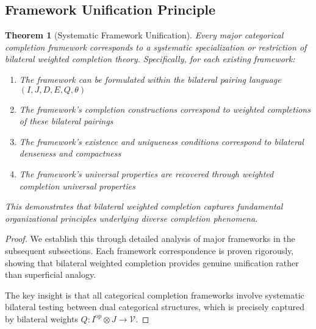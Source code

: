 \documentclass[11pt]{article}
\theoremstyle{plain}
\newtheorem{theorem}{Theorem}[section]
\theoremstyle{definition}
\theoremstyle{remark}
\newcommand{\V}{\mathcal{V}}
\newcommand{\op}{\mathrm{op}}
\begin{document}
\subsection{Framework Unification Principle}

\begin{theorem}[Systematic Framework Unification]\label{thm:framework-unification}
Every major categorical completion framework corresponds to a systematic specialization or restriction of bilateral weighted completion theory. Specifically, for each existing framework:

\begin{enumerate}
\item The framework can be formulated within the bilateral pairing language $(I, J, D, E, Q, \theta)$
\item The framework's completion constructions correspond to weighted completions of these bilateral pairings
\item The framework's existence and uniqueness conditions correspond to bilateral denseness and compactness
\item The framework's universal properties are recovered through weighted completion universal properties
\end{enumerate}

This demonstrates that bilateral weighted completion captures fundamental organizational principles underlying diverse completion phenomena.
\end{theorem}

\begin{proof}
We establish this through detailed analysis of major frameworks in the subsequent subsections. Each framework correspondence is proven rigorously, showing that bilateral weighted completion provides genuine unification rather than superficial analogy.

The key insight is that all categorical completion frameworks involve systematic bilateral testing between dual categorical structures, which is precisely captured by bilateral weights $Q : I^{\op} \otimes J \to \V$.
\end{proof}
\end{document}
